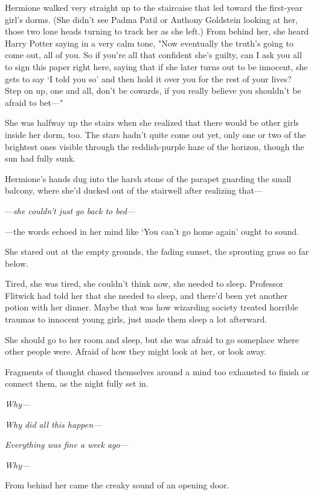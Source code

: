 Hermione walked very straight up to the staircaise that led toward the
first-year girl's dorms. (She didn't see Padma Patil or Anthony Goldstein
looking at her, those two lone heads turning to track her as she left.) From
behind her, she heard Harry Potter saying in a very calm tone, "Now eventually
the truth's going to come out, all of you. So if you're all that confident she's
guilty, can I ask you all to sign this paper right here, saying that if she
later turns out to be innocent, she gets to say `I told you so' and then hold
it over you for the rest of your lives? Step on up, one and all, don't be
cowards, if you really believe you shouldn't be afraid to bet---"

She was halfway up the stairs when she realized that there would be other girls
inside her dorm, too.
\later
The stars hadn't quite come out yet, only one or two of the brightest ones
visible through the reddish-purple haze of the horizon, though the sun had
fully sunk.

Hermione's hands dug into the harsh stone of the parapet guarding the small
balcony, where she'd ducked out of the stairwell after realizing that---

---\emph{she couldn't just go back to bed}---

---the words echoed in her mind like `You can't go home again' ought to sound.

She stared out at the empty grounds, the fading sunset, the sprouting grass so
far below.

Tired, she was tired, she couldn't think now, she needed to sleep. Professor
Flitwick had told her that she needed to sleep, and there'd been yet another
potion with her dinner. Maybe that was how wizarding society treated horrible
traumas to innocent young girls, just made them sleep a lot afterward.

She should go to her room and sleep, but she was afraid to go someplace where
other people were. Afraid of how they might look at her, or look away.

Fragments of thought chased themselves around a mind too exhausted to finish or
connect them, as the night fully set in.

\emph{Why---}

\emph{Why did all this happen---}

\emph{Everything was fine a week ago---}

\emph{Why---}

From behind her came the creaky sound of an opening door.

